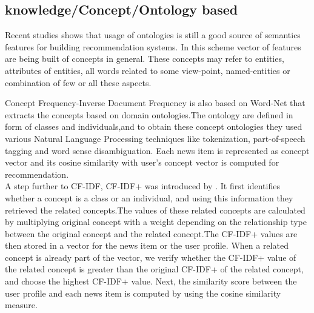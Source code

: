 \subsection{knowledge/Concept/Ontology based }
Recent studies shows that usage of ontologies is still a good source of semantics features for building recommendation systems. In this scheme vector of features are being built of concepts in general. These concepts may refer to entities, attributes of entities, all words related to some view-point, named-entities or combination of few or all these aspects.


\cite{CF-IDF} Concept Frequency-Inverse Document Frequency is also based on Word-Net that extracts the concepts based on domain ontologies.The ontology are defined in form of classes and individuals,and to obtain these concept ontologies they used various Natural Language Processing techniques like tokenization, part-of-speech tagging and word sense disambiguation. Each news item is represented as concept vector and its cosine similarity with user's concept vector is computed for recommendation.\\A step further to CF-IDF, CF-IDF+ was introduced by \cite{CF-IDF+}. It first identifies whether a concept is a class or an individual, and using this information they retrieved the related concepts.The values of these related concepts are calculated by multiplying original concept with a weight depending on the relationship type between the original concept and the related concept.The CF-IDF+ values are then stored in a vector for the news item or the user profile. When a related concept is already part of the vector, we verify whether the CF-IDF+ value of the related concept is greater than the original CF-IDF+ of the related concept, and choose the highest CF-IDF+ value. Next, the similarity score between the user profile and each news item is computed by using the cosine similarity measure.

